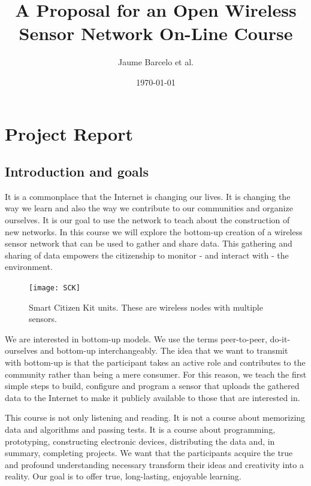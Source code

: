 \documentclass[a4paper,oneside]{book}   %
\begin{document}
\title{A Proposal for an  Open Wireless Sensor Network On-Line Course} %
\author{Jaume Barcelo et al.} %
\date{\today}    %

\maketitle %
\tableofcontents

\chapter{Project Report}
\section{Introduction and goals} %

It is a commonplace that the Internet is changing our lives.
It is changing the way we learn and also the way we contribute to our communities and organize ourselves.
It is our goal to use the network to teach about the construction of new networks.
In this course we will explore the bottom-up creation of a wireless sensor network that can be used to gather and share data.
This gathering and sharing of data empowers the citizenship to monitor - and interact with - the environment.

\begin{figure}
\begin{center}
\texttt{[image: SCK]}
\caption{Smart Citizen Kit units. These are wireless nodes with multiple sensors.}
\label{fig:SCK}
\end{center}
\end{figure}

We are interested in bottom-up models.
We use the terms peer-to-peer, do-it-ourselves and bottom-up interchangeably.
The idea that we want to transmit with bottom-up is that the participant takes an active role and contributes to the community rather than being a mere consumer.
For this reason, we teach the first simple steps to build, configure and program a sensor that uploads the gathered data to the Internet to make it publicly available to those that are interested in.

This course is not only listening and reading. 
It is not a course about memorizing data and algorithms and passing tests.
It is a course about programming, prototyping, constructing electronic devices, distributing the data and, in summary, completing projects.
We want that the participants acquire the true and profound understanding necessary transform their ideas and creativity into a reality.
Our goal is to offer true, long-lasting, enjoyable learning.
\end{document}
